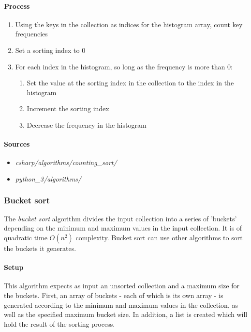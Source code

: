 \documentclass{article}
\begin{document}
\paragraph{Process}
\begin{enumerate}
\item{Using the keys in the collection as indices for the histogram array, count key frequencies}
\item{Set a sorting index to 0}
\item{For each index in the histogram, so long as the frequency is more than 0:}
  \begin{enumerate}
  \item{Set the value at the sorting index in the collection to the index in the histogram}
  \item{Increment the sorting index}
  \item{Decrease the frequency in the histogram}
  \end{enumerate}
\end{enumerate}

\begin{samepage}
  \paragraph{Sources}
  \begin{itemize}
  \item{{\em csharp/algorithms/counting\_sort/}}
  \item{{\em python\_3/algorithms/}}
  \end{itemize}
\end{samepage}


\subsubsection{Bucket sort}
The {\em bucket sort} algorithm divides the input collection into a series of 'buckets' depending on the minimum and
maximum values in the input collection. It is of quadratic time \(O(n^2)\) complexity. Bucket sort can use other
algorithms to sort the buckets it generates.

\paragraph{Setup}
This algorithm expects as input an unsorted collection and a maximum size for the buckets. First, an array of
buckets - each of which is its own array - is generated according to the minimum and maximum values in the
collection, as well as the specified maximum bucket size. In addition, a list is created which will hold the
result of the sorting process.
\end{document}
